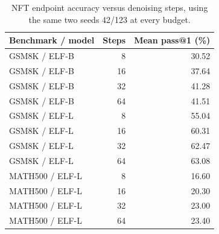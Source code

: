 \begin{table}[t]
\caption{NFT endpoint accuracy versus denoising steps, using the same two seeds 42/123 at every budget.}
\label{tab:lowsteps}
\centering\small
\begin{tabular}{lrr}
\toprule
Benchmark / model & Steps & Mean pass@1 (\%) \\
\midrule
GSM8K / ELF-B & 8 & 30.52 \\
GSM8K / ELF-B & 16 & 37.64 \\
GSM8K / ELF-B & 32 & 41.28 \\
GSM8K / ELF-B & 64 & 41.51 \\
GSM8K / ELF-L & 8 & 55.04 \\
GSM8K / ELF-L & 16 & 60.31 \\
GSM8K / ELF-L & 32 & 62.47 \\
GSM8K / ELF-L & 64 & 63.08 \\
MATH500 / ELF-L & 8 & 16.60 \\
MATH500 / ELF-L & 16 & 20.30 \\
MATH500 / ELF-L & 32 & 23.00 \\
MATH500 / ELF-L & 64 & 23.40 \\
\bottomrule
\end{tabular}
\end{table}
